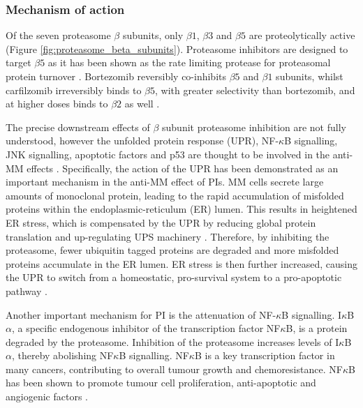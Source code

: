 \subsubsection{Mechanism of action}
Of the seven proteasome $\beta$ subunits, only $\beta1$, $\beta3$ and $\beta5$ are proteolytically active (Figure \ref{fig:proteasome_beta_subunits}). Proteasome inhibitors are designed to target $\beta5$ as it has been shown as the rate limiting protease for proteasomal protein turnover \cite{besse2019proteasome}. Bortezomib reversibly co-inhibits $\beta5$ and $\beta1$ subunits, whilst carfilzomib irreversibly binds to $\beta5$, with greater selectivity than bortezomib, and at higher doses binds to $\beta2$ as well \cite{besse2019proteasome}.


The precise downstream effects of $\beta$ subunit proteasome inhibition are not fully understood, however the unfolded protein response (UPR), NF-$\kappa$B signalling, JNK signalling, apoptotic factors and p53 are thought to be involved in the anti-MM effects \cite{kubiczkova2014proteasome}.
Specifically, the action of the UPR has been demonstrated as an important mechanism in the anti-MM effect of PIs.
MM cells secrete large amounts of monoclonal protein, leading to the rapid accumulation of  misfolded proteins within the endoplasmic-reticulum (ER) lumen.
This results in heightened ER stress, which is compensated by the UPR by reducing global protein translation and up-regulating UPS machinery \cite{wallington2018resistance}.
Therefore, by inhibiting the proteasome, fewer ubiquitin tagged proteins are degraded and more misfolded proteins accumulate in the ER lumen.
ER stress is then further increased, causing the UPR to switch from a homeostatic, pro-survival system to a pro-apoptotic pathway \cite{kubiczkova2014proteasome, wallington2018resistance}.

Another important mechanism for PI is the attenuation of NF-$\kappa$B signalling. I$\kappa$B$\alpha$, a specific endogenous inhibitor of the transcription factor NF$\kappa$B, is a protein degraded by the proteasome.
Inhibition of the proteasome increases levels of I$\kappa$B$\alpha$, thereby abolishing NF$\kappa$B signalling.
NF$\kappa$B is a key transcription factor in many cancers, contributing to overall tumour growth and chemoresistance.
NF$\kappa$B has been shown to promote tumour cell proliferation, anti-apoptotic and angiogenic factors \cite{kale2012molecular}.

